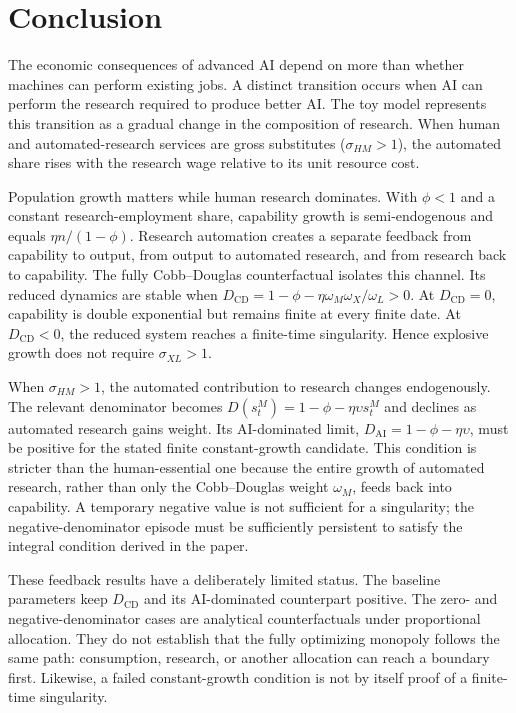 \section{Conclusion}
\label{sec:conclusion}

The economic consequences of advanced AI depend on more than whether machines can
perform existing jobs. A distinct transition occurs when AI can perform the research
required to produce better AI. The toy model represents this transition as a gradual
change in the composition of research. When human and automated-research services are
gross substitutes ($\sigma_{HM}>1$), the automated share rises with the research wage
relative to its unit resource cost.

Population growth matters while human research dominates. With $\phi<1$ and a
constant research-employment share, capability growth is semi-endogenous and equals
$\eta n/(1-\phi)$. Research automation creates a separate feedback from capability
to output, from output to automated research, and from research back to capability.
The fully Cobb--Douglas counterfactual isolates this channel. Its reduced dynamics
are stable when
$D_{\mathrm{CD}}=1-\phi-\eta\omega_M\omega_X/\omega_L>0$.
At $D_{\mathrm{CD}}=0$, capability is double exponential but remains finite at every
finite date. At $D_{\mathrm{CD}}<0$, the reduced system reaches a finite-time
singularity. Hence explosive growth does not require $\sigma_{XL}>1$.

When $\sigma_{HM}>1$, the automated contribution to research changes endogenously.
The relevant denominator becomes
$D(s^M_t)=1-\phi-\eta\upsilon s^M_t$ and declines as automated research gains weight.
Its AI-dominated limit,
$D_{\mathrm{AI}}=1-\phi-\eta\upsilon$, must be positive for the stated finite
constant-growth candidate. This condition is stricter than the human-essential one because the
entire growth of automated research, rather than only the Cobb--Douglas weight
$\omega_M$, feeds back into capability. A temporary negative value is not sufficient
for a singularity; the negative-denominator episode must be sufficiently persistent
to satisfy the integral condition derived in the paper.

These feedback results have a deliberately limited status. The baseline parameters
keep $D_{\mathrm{CD}}$ and its AI-dominated counterpart positive. The zero- and
negative-denominator cases are analytical counterfactuals under proportional
allocation. They do not establish that the fully optimizing monopoly follows the
same path: consumption, research, or another allocation can reach a boundary first.
Likewise, a failed constant-growth condition is not by itself proof of a finite-time
singularity.

